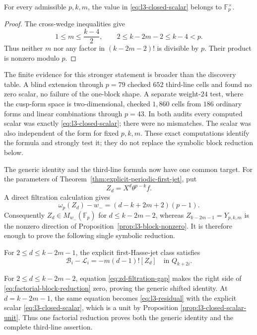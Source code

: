 \begin{proposition}
\label{prop:l3-closed-scalar-unit}
For every admissible $p,k,m$, the value in
\eqref{eq:l3-closed-scalar} belongs to $\mathbb F_p^\times$.
\end{proposition}

\begin{proof}
The cross-wedge inequalities give
\[
 1\leq m\leq\frac{k-4}{2},
 \qquad
 2\leq k-2m-2\leq k-4<p.
\]
Thus neither $m$ nor any factor in $(k-2m-2)!$ is divisible by $p$.
Their product is nonzero modulo $p$.
\end{proof}

The finite evidence for this stronger statement is broader than the
discovery table.  A blind extension through $p=79$ checked $652$
third-line cells and found no zero scalar, no failure of the one-block
shape.  A separate weight-$24$ test, where the cusp-form space is
two-dimensional, checked $1{,}860$ cells from $186$ ordinary forms and
linear combinations through $p=43$.  In both audits every computed scalar
was exactly \eqref{eq:l3-closed-scalar}; there were no mismatches.  The
scalar was also independent of the form for fixed $p,k,m$.  These exact
computations identify the formula and strongly test it; they do not replace
the symbolic block reduction below.

The generic identity and the third-line formula now have one common target.
For the parameters of Theorem~\ref{thm:explicit-periodic-first-jet}, put
\[
 Z_d=X^d\theta^{p-k}f.
\]
A direct filtration calculation gives
\begin{equation}\label{eq:zd-filtration-gap}
 \omega_p(Z_d)-w_-
 =(d-k+2m+2)(p-1).
\end{equation}
Consequently $Z_d\in M_{w_-}(\mathbb F_p)$ for
$d\leq k-2m-2$, whereas $Z_{k-2m-1}=Y_{p,k,m}$ is the nonzero direction
of Proposition~\ref{prop:l3-block-nonzero}.  It is therefore enough to
prove the following single symbolic reduction.

\begin{conjecture}
\label{conj:factorial-block-reduction}
For $2\leq d\leq k-2m-1$, the explicit first-Hasse-jet class satisfies
\begin{equation}\label{eq:factorial-block-reduction}
 \mathcal B_i-\mathcal L_i
 =-m(d-1)![Z_d]
 \quad\text{in }Q_{k+2i}.
\end{equation}
\end{conjecture}

For $2\leq d\leq k-2m-2$, equation
\eqref{eq:zd-filtration-gap} makes the right side of
\eqref{eq:factorial-block-reduction} zero, proving the generic shifted
identity.  At $d=k-2m-1$, the same equation becomes
\eqref{eq:l3-residual} with the explicit scalar
\eqref{eq:l3-closed-scalar}, which is a unit by Proposition
\ref{prop:l3-closed-scalar-unit}.  Thus one factorial reduction proves both
the generic identity and the complete third-line assertion.

